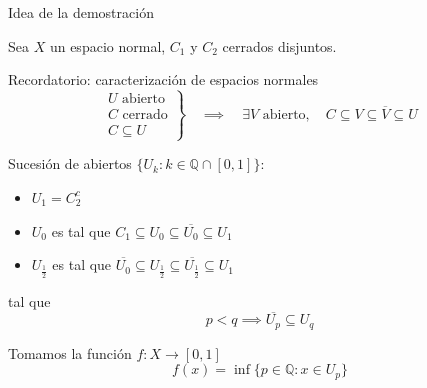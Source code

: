 \documentclass{beamer}
\begin{document}
\begin{frame}{Idea de la demostración}

  Sea $X$ un espacio normal, $C_1$ y $C_2$ cerrados disjuntos.
  
  \begin{block}{Recordatorio: caracterización de espacios normales}
    $$
    \left.
    \begin{array}{l}
    U \text{ abierto} \\
    C \text{ cerrado} \\
    C \subseteq U
    \end{array}
    \right\}
    \quad \implies \quad
    \exists V \text{ abierto}, \quad C \subseteq V \subseteq \overline{V} \subseteq U
    $$
  \end{block}

  Sucesión de abiertos $\{U_k : k \in \mathbb{Q} \cap [0, 1]\}$:

  \begin{itemize}
    \item $U_1 = C_2^c$
    \item $U_0$ es tal que $C_1 \subseteq U_0 \subseteq \overline{U_0} \subseteq U_1$
    \item $U_{\frac{1}{2}}$ es tal que $\overline{U_0} \subseteq U_{\frac{1}{2}} \subseteq \overline{U_{\frac{1}{2}}} \subseteq U_1$
  \end{itemize}

  tal que
  \begin{equation}
  p < q \implies \overline{U_p} \subseteq U_q \tag{$\star$} \label{eq:star}
  \end{equation}

  Tomamos la función $f : X \to [0, 1]$
  $$
  f(x) = \inf \{p \in \mathbb{Q} : x \in U_p\}
  $$

\end{frame}
\end{document}
